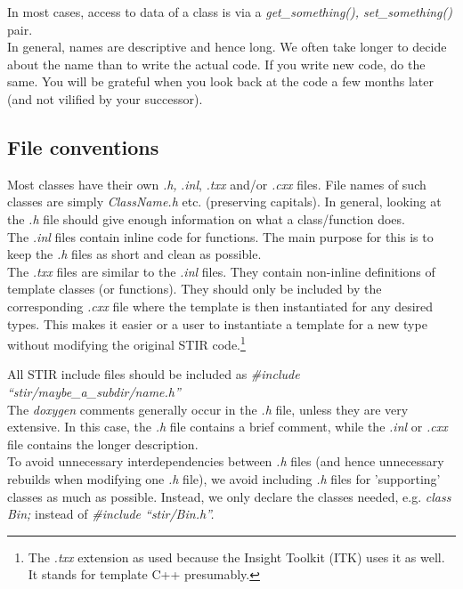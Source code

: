 \documentclass{article}
\begin{document}
In most cases, access to data of a class is via a \textit{get\_something(), 
set\_something()} pair.\\
In general, names are descriptive and hence long. We often take 
longer to decide about the name than to write the actual code. 
If you write new code, do the same. You will be grateful when 
you look back at the code a few months later (and not vilified 
by your successor). 

\subsection{
File conventions }

Most classes have their own \textit{.h,} .\textit{inl}, \textit{.txx} and/or \textit{.cxx} files. 
File names of such classes are simply \textit{ClassName.h} {\nobreakspace}etc. 
(preserving capitals). In general, looking at 
the \textit{.h} file should give enough information on what a class/function 
does. \\
The \textit{.inl} files contain inline code 
for functions. The main purpose for this is to keep the \textit{.h} 
files as short and clean as possible. \\
The \textit{.txx} files are similar to the \textit{.inl} files. They contain non-inline 
definitions of template classes (or functions). They should only be included by the
corresponding \textit{.cxx} file where the template is then instantiated for any desired types.
This makes it easier or a user to instantiate a template for a new type without modifying the
original STIR code.\footnote{The \textit{.txx} extension as used because the Insight Toolkit (ITK) 
uses it as well. It stands for template C++ presumably.}


All STIR include files should be included as \textit{\#include ``stir/maybe\_a\_subdir/name.h''}\\
The \textit{doxygen} comments generally occur in the \textit{.h} file, unless 
they are very extensive. In this case, the \textit{.h} file contains 
a brief comment, while the \textit{.inl} or \textit{.cxx} file contains 
the longer description.\\
To avoid unnecessary interdependencies between \textit{.h} files (and 
hence unnecessary rebuilds when modifying one \textit{.h} file), we 
avoid including \textit{.h} files for 'supporting' classes as much 
as possible. Instead, we only declare the classes needed, e.g. \textit{class 
Bin;} instead of \textit{\#include ``stir/Bin.h''.}
\end{document}

